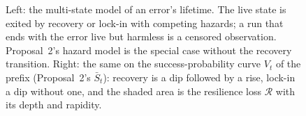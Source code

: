 \begin{figure}[h]
\caption{Left: the multi-state model of an error's lifetime. The live state is exited by recovery or lock-in with competing hazards; a run that ends with the error live but harmless is a censored observation. Proposal~2's hazard model is the special case without the recovery transition. Right: the same on the success-probability curve $V_t$ of the prefix (Proposal~2's $\bar S_t$): recovery is a dip followed by a rise, lock-in a dip without one, and the shaded area is the resilience loss $\mathcal{R}$ with its depth and rapidity.}
\label{fig:lifecycle}
\end{figure}

